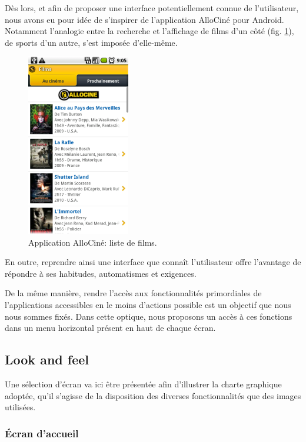 \documentclass[french, titlepage, 11pt, a4paper]{article}
\begin{document}
	Dès lors, et afin de proposer une interface potentiellement connue de
	l'utilisateur, nous avons eu pour idée de s'inspirer de l'application AlloCiné
	pour Android.
	Notamment l'analogie entre la recherche et l'affichage de films d'un côté (fig. \ref{fig:allocine}), de
	sports d'un autre, s'est imposée d'elle-même.

	\begin{figure}[htb]
		\centering
		\includegraphics[width=0.4\textwidth]{allocine.png}
		\caption{Application AlloCiné: liste de films.}
		\label{fig:allocine}
	\end{figure}

	En outre, reprendre ainsi une interface que connaît l'utilisateur offre
	l'avantage de répondre à ses habitudes, automatismes et exigences.

	De la même manière, rendre l'accès aux fonctionnalités primordiales de
	l'applications accessibles en le moins d'actions possible est un objectif que
	nous nous sommes fixés.
	Dans cette optique, nous proposons un accès à ces fonctions dans un menu
	horizontal présent en haut de chaque écran.

	\subsection{Look and feel}

	Une sélection d'écran va ici être présentée afin d'illustrer la charte
	graphique adoptée, qu'il s'agisse de la disposition des diverses
	fonctionnalités que des images utilisées.

		\subsubsection{Écran d'accueil}
\end{document}
